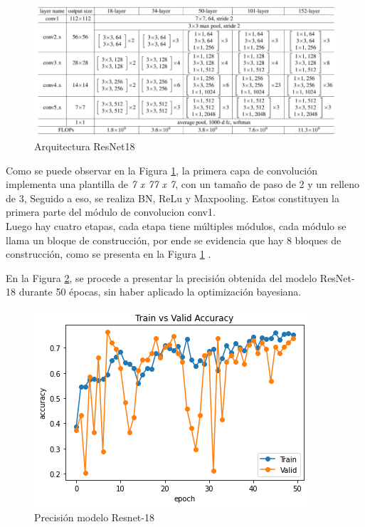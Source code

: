 \begin{figure}[ht]
	\centering
	\includegraphics[scale=0.65]{Figs/68.png}
	\caption{Arquitectura ResNet18}
	\label{fig:ArqRes18}
\end{figure}


Como se puede observar en la Figura \ref{fig:ArqRes18}, la primera capa de convolución implementa una plantilla de \textit{7 x 77 x 7}, con un tamaño de paso de 2 y un relleno de 3, Seguido a eso, se realiza BN, ReLu y Maxpooling. Estos constituyen la primera parte del módulo de convolucion conv1.\\

Luego hay cuatro etapas, cada etapa tiene múltiples módulos, cada módulo se llama un bloque de construcción, por ende se evidencia que hay 8 bloques de construcción, como se presenta en la Figura \ref{fig:ArqRes18} \cite{ref_5}.				


\newpage	
En la Figura \ref{fig:preci_RESNET18}, se procede a presentar la precisión obtenida del modelo ResNet-18 durante 50 épocas, sin haber aplicado la optimización bayesiana.

\begin{figure}[ht]
	\centering
	\includegraphics[scale=0.55]{Figs/109.png}
	\caption{Precisión modelo Resnet-18}
	\label{fig:preci_RESNET18}
\end{figure}

